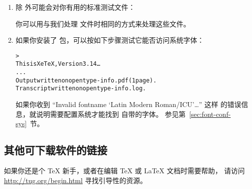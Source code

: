 \documentclass{article}
\begin{document}
\begin{enumerate}
\item 除  外可能会对你有用的标准测试文件：

你可以用与我们处理  文件时相同的方式来处理这些文件。

\item 如果你安装了  包，可以按如下步骤测试它能否访问系统字体：
\begin{alltt}
> 
This is XeTeX, Version 3.14\dots
...
Output written on opentype-info.pdf (1 page).
Transcript written on opentype-info.log.
\end{alltt}

如果你收到 ``Invalid fontname `Latin Modern Roman/ICU'\dots'' 这样
的错误信息，就说明需要配置系统才能找到 \TL{} 自带的字体。
参见第~\ref{sec:font-conf-sys}~节。

\end{enumerate}

\subsection{其他可下载软件的链接}

如果你还是个 \TeX{} 新手，或者在编辑 \TeX{} 或 \LaTeX{} 文档时需要帮助，
请访问 \url{http://tug.org/begin.html} 寻找引导性的资源。
\end{document}
